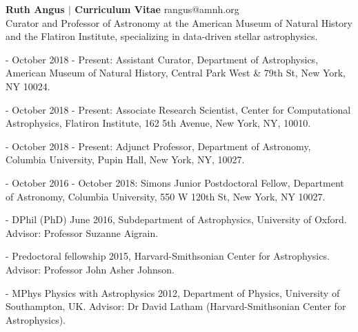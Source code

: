 \documentclass[12pt,letterpaper]{article}
\begin{document}
\thispagestyle{empty}\sloppy\sloppypar\raggedbottom

\textbf{\Large Ruth Angus $\vert$ Curriculum Vitae} \hfill
\textsf{\small rangus@amnh.org} \\[0.5ex]
Curator and Professor of Astronomy at the American Museum of Natural History
and the Flatiron Institute, specializing in data-driven stellar astrophysics.
\\[0.5ex]

\begin{list}{}{\cvlist}
\item
    - October 2018 - Present: Assistant Curator, Department of Astrophysics,
    American Museum of Natural History, Central Park West \& 79th St,
    New York, NY 10024.
\item
    - October 2018 - Present: Associate Research Scientist, Center for
    Computational Astrophysics, Flatiron Institute, 162 5th Avenue, New York,
    NY, 10010.
\item
    - October 2018 - Present: Adjunct Professor, Department of
    Astronomy, Columbia University, Pupin Hall, New York, NY, 10027.
\item
    - October 2016 - October 2018: Simons Junior Postdoctoral Fellow,
    Department of Astronomy, Columbia University, 550 W 120th St, New York,
    NY 10027.
\end{list}

\begin{list}{}{\cvlist}
\item
- DPhil (PhD) June 2016, Subdepartment of Astrophysics, University of
Oxford.
Advisor: Professor Suzanne Aigrain.
\item
- Predoctoral fellowship 2015, Harvard-Smithsonian Center for Astrophysics.
Advisor: Professor John Asher Johnson.
\item
- MPhys Physics with Astrophysics 2012, Department of Physics, University of
Southampton, UK. Advisor: Dr David Latham (Harvard-Smithsonian Center for
Astrophysics).
\end{list}
\end{document}
